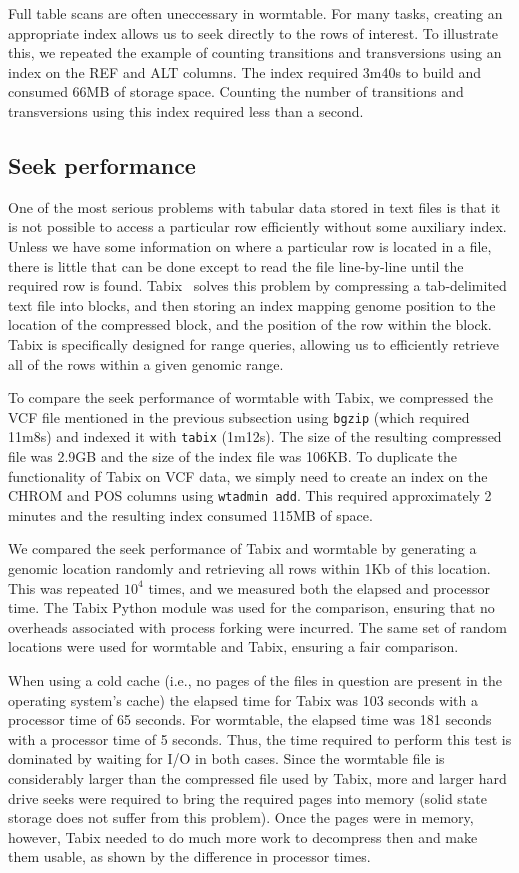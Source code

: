 \documentclass[10pt]{bmc_article}
\newenvironment{bmcformat}{\begin{raggedright}\baselineskip20pt\sloppy\setboolean{publ}{false}}{\end{raggedright}\baselineskip20pt\sloppy}
\begin{document}
\begin{bmcformat}
Full table scans are often uneccessary in wormtable. For many tasks,
creating an appropriate index allows us to seek directly to the 
rows of interest. To illustrate this, we repeated the example 
of counting transitions and transversions using an index 
on the REF and ALT columns.
The index required 3m40s to build and 
consumed 66MB of storage space. Counting the number of 
transitions and transversions using this index required 
less than a second.

\subsection*{Seek performance}
One of the most serious problems with tabular data stored in text files
is that it is not possible to access a particular row 
efficiently without some auxiliary 
index. Unless we have some information on where a particular row is located
in a file, there is little that can be done except to read the file 
line-by-line until the required row is found. Tabix~\cite{li11} solves
this problem by compressing a tab-delimited text file into blocks, and 
then storing an index mapping genome position to the location 
of the compressed block, and the position of the row within the block.
Tabix is specifically designed for range queries, allowing us to 
efficiently retrieve all of the rows within a given genomic range.

To compare the seek performance of wormtable with Tabix, we compressed
the VCF file mentioned in the previous subsection using \texttt{bgzip}
(which required 11m8s) and indexed it with \texttt{tabix} (1m12s). 
The size of the resulting compressed file was 2.9GB and 
the size of the index file was 106KB.
To duplicate the functionality of Tabix on VCF data, we simply need to 
create an index on the CHROM and POS columns using \texttt{wtadmin add}. 
This required approximately
2 minutes and the resulting index consumed 115MB of space.

We compared the seek performance of Tabix and wormtable by generating 
a genomic location randomly and retrieving all rows within 1Kb of
this location. This 
was repeated $10^4$ times, and we measured both the elapsed and 
processor time. The Tabix Python module was used for the 
comparison, ensuring that no overheads associated with process 
forking were incurred. The same set of random locations were used 
for wormtable and Tabix, ensuring a fair comparison.

When using a cold cache (i.e., no pages of the files in question are 
present in the operating system's cache) the elapsed
time for Tabix was 103 seconds with a processor time of 65
seconds. For wormtable, the elapsed time was 181 seconds 
with a processor time of 5 seconds. Thus, the time required 
to perform this test is dominated by waiting for I/O in both 
cases. Since the wormtable file is considerably larger than the 
compressed file used by Tabix, more and larger hard drive
seeks were required 
to bring the required pages into memory (solid state 
storage does not suffer from this problem). Once the 
pages were in memory, however, Tabix needed to do much more work to 
decompress then and make them usable, as shown by the 
difference in processor times.


\end{bmcformat}
\end{document}
